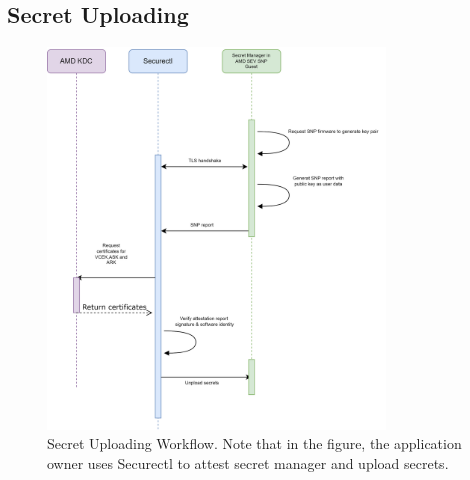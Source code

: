 \subsection{Secret Uploading}
\label{sec:design_Secret_Uploading}

\begin{figure}[H]
    \centering
    \includegraphics[width=0.8\textwidth]{images/upload_secret.png}
    \caption[Secret Uploading Workflow]{Secret Uploading Workflow. Note that in the figure, the application owner uses Securectl to attest secret manager and upload secrets.}
    \label{fig:upload_secret}
\end{figure}

